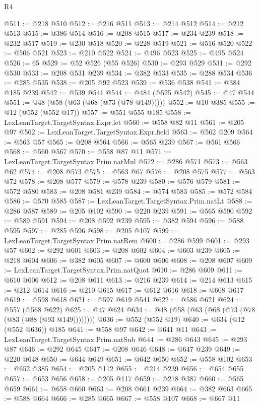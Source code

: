 \begin{lexlean}{R4}
\begin{coremodule}
@511 := @218 @510
@512 := @216 @511
@513 := @214 @512
@514 := @212 @513
@515 := @386 @514
@516 := @208 @515
@517 := @234 @239
@518 := @232 @517
@519 := @230 @518
@520 := @228 @519
@521 := @516 @520
@522 := @506 @521
@523 := @210 @522
@524 := @496 @523
@525 := @495 @524
@526 := 65
@529 := @52 @526 (@55 @526)
@530 := @293 @529
@531 := @292 @530
@533 := @208 @531 @239
@534 := @382 @533
@535 := @288 @534
@536 := @285 @535
@538 := @205 @92 @523
@539 := @536 @538
@541 := @384 @185 @239
@542 := @539 @541
@544 := @484 (@525 @542)
@545 := @47 @544
@551 := @48 (@58 (@63 (@68 (@73 (@78 @149)))))
@552 := @10 @385
@555 := @12 (@552 (@552 @17))
@557 := @551 @555 @185
@558 := LexLeanTarget.TargetSyntax.Expr.let
@560 := @558 @82 @11
@561 := @205 @97
@562 := LexLeanTarget.TargetSyntax.Expr.field
@563 := @562 @209
@564 := @563 @57
@565 := @208 @564
@566 := @565 @239
@567 := @561 @566
@568 := @560 @567
@570 := @558 @87 @11
@571 := LexLeanTarget.TargetSyntax.Prim.natMul
@572 := @286 @571
@573 := @563 @62
@574 := @208 @573
@575 := @563 @67
@576 := @208 @575
@577 := @563 @72
@578 := @208 @577
@579 := @578 @239
@580 := @576 @579
@581 := @572 @580
@583 := @208 @581 @239
@584 := @574 @583
@585 := @572 @584
@586 := @570 @585
@587 := LexLeanTarget.TargetSyntax.Prim.natLt
@588 := @286 @587
@589 := @205 @102
@590 := @220 @239
@591 := @565 @590
@592 := @589 @591
@594 := @208 @592 @239
@595 := @382 @594
@596 := @588 @595
@597 := @285 @596
@598 := @205 @107
@599 := LexLeanTarget.TargetSyntax.Prim.natRem
@600 := @286 @599
@601 := @293 @57
@602 := @292 @601
@603 := @208 @602
@604 := @603 @239
@605 := @218 @604
@606 := @382 @605
@607 := @600 @606
@608 := @208 @607
@609 := LexLeanTarget.TargetSyntax.Prim.natQuot
@610 := @286 @609
@611 := @610 @606
@612 := @208 @611
@613 := @216 @239
@614 := @214 @613
@615 := @212 @614
@616 := @210 @615
@617 := @612 @616
@618 := @608 @617
@619 := @598 @618
@621 := @597 @619 @541
@622 := @586 @621
@624 := @557 (@568 @622)
@625 := @47 @624
@634 := @48 (@58 (@63 (@68 (@73 (@78 (@83 (@88 (@93 @149))))))))
@636 := @552 (@552 @19)
@640 := @634 (@12 (@552 @636)) @185
@641 := @558 @97
@642 := @641 @11
@643 := LexLeanTarget.TargetSyntax.Prim.natSub
@644 := @286 @643
@645 := @293 @87
@646 := @292 @645
@647 := @208 @646
@648 := @647 @239
@649 := @220 @648
@650 := @644 @649
@651 := @642 @650
@652 := @558 @102
@653 := @652 @385
@654 := @205 @112
@655 := @214 @239
@656 := @654 @655
@657 := @653 @656
@658 := @205 @117
@659 := @218 @387
@660 := @565 @659
@661 := @658 @660
@663 := @208 @661 @239
@664 := @382 @663
@665 := @588 @664
@666 := @285 @665
@667 := @558 @107
@668 := @667 @11

\end{coremodule}
\end{lexlean}
